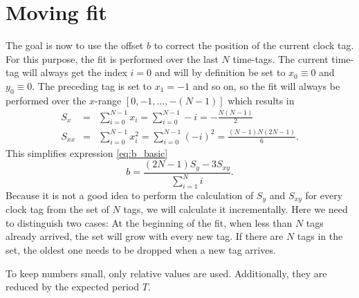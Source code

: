 \documentclass[]{scrreprt}
\begin{document}
\chapter{Moving fit}
The goal is now to use the offset $b$ to correct the position of the current clock tag. For this purpose, the fit is performed over the last $N$ time-tags. The current time-tag will always get the index $i=0$ and will by definition be set to $x_0 \equiv 0$ and $y_0 \equiv 0$. The preceding tag is set to $x_1 = -1$ and so on, so the fit will always be performed over the $x$-range $[0, -1, \dots, -(N-1)]$ which results in
\begin{eqnarray}
    S_x &=& \sum_{i=0}^{N-1} x_i = \sum_{i=0}^{N-1} -i = - \frac{N (N-1)}{2} \\
    S_{xx} &=& \sum_{i=0}^{N-1} x_i^2 = \sum_{i=0}^{N-1} (-i)^2 = \frac{(N-1) N (2N - 1)}{6}.
\end{eqnarray}
This simplifies expression \ref{eq:b_basic}
\begin{equation}
    b = \frac{(2N - 1) S_y - 3 S_{xy}}{\sum_{i=1}^N i}.
\end{equation}
Because it is not a good idea to perform the calculation of $S_y$ and $S_{xy}$ for every clock tag from the set of $N$ tags, we will calculate it incrementally. Here we need to distinguish two cases: At the beginning of the fit, when less than $N$ tags already arrived, the set will grow with every new tag. If there are $N$ tags in the set, the oldest one needs to be dropped when a new tag arrives.
\par To keep numbers small, only relative values are used. Additionally, they are reduced by the expected period $T$.
\end{document}
